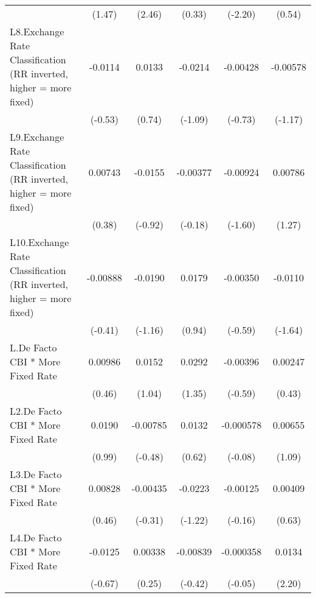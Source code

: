 {\begin{longtable}{l*{5}{c}}
                &   (1.47)         &   (2.46)         &   (0.33)         &  (-2.20)         &   (0.54)         \\
\addlinespace
L8.Exchange Rate Classification (RR inverted, higher = more fixed)&  -0.0114         &   0.0133         &  -0.0214         & -0.00428         & -0.00578         \\
                &  (-0.53)         &   (0.74)         &  (-1.09)         &  (-0.73)         &  (-1.17)         \\
\addlinespace
L9.Exchange Rate Classification (RR inverted, higher = more fixed)&  0.00743         &  -0.0155         & -0.00377         & -0.00924         &  0.00786         \\
                &   (0.38)         &  (-0.92)         &  (-0.18)         &  (-1.60)         &   (1.27)         \\
\addlinespace
L10.Exchange Rate Classification (RR inverted, higher = more fixed)& -0.00888         &  -0.0190         &   0.0179         & -0.00350         &  -0.0110         \\
                &  (-0.41)         &  (-1.16)         &   (0.94)         &  (-0.59)         &  (-1.64)         \\
\addlinespace
L.De Facto CBI * More Fixed Rate&  0.00986         &   0.0152         &   0.0292         & -0.00396         &  0.00247         \\
                &   (0.46)         &   (1.04)         &   (1.35)         &  (-0.59)         &   (0.43)         \\
\addlinespace
L2.De Facto CBI * More Fixed Rate&   0.0190         & -0.00785         &   0.0132         &-0.000578         &  0.00655         \\
                &   (0.99)         &  (-0.48)         &   (0.62)         &  (-0.08)         &   (1.09)         \\
\addlinespace
L3.De Facto CBI * More Fixed Rate&  0.00828         & -0.00435         &  -0.0223         & -0.00125         &  0.00409         \\
                &   (0.46)         &  (-0.31)         &  (-1.22)         &  (-0.16)         &   (0.63)         \\
\addlinespace
L4.De Facto CBI * More Fixed Rate&  -0.0125         &  0.00338         & -0.00839         &-0.000358         &   0.0134\sym{*}  \\
                &  (-0.67)         &   (0.25)         &  (-0.42)         &  (-0.05)         &   (2.20)         \\

\end{longtable}}
